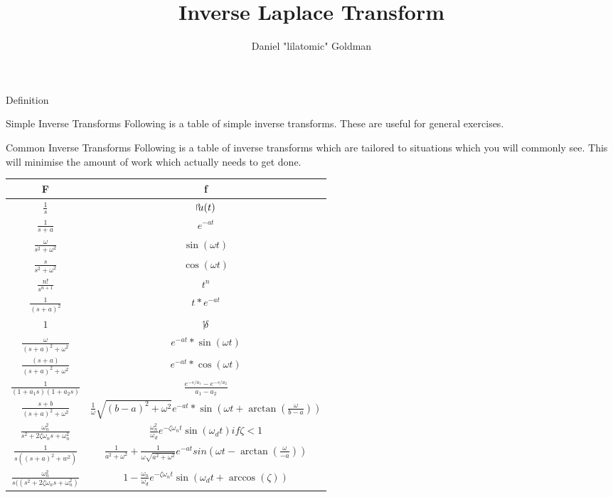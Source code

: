 \documentclass{../templates/mathtool}
\title{Inverse Laplace Transform}
\author{Daniel "lilatomic" Goldman}
\begin{document}
\maketitle

\begin{section}{Definition}
\end{section}

\begin{section}{Simple Inverse Transforms}
	Following is a table of simple inverse transforms. These are useful for general exercises.
\end{section}

\begin{section}{Common Inverse Transforms}
	Following is a table of inverse transforms which are tailored to situations which you will commonly see. This will minimise the amount of work which actually needs to get done.
	
\end{section}
	\begin{tabular}{|c|c|}
		\hline
		F & f \\
		\hline \hline
		$\frac{1}{s}$ & $\ustep(t)$ \\
			\hline
		$\frac{1}{s+a}$ & $e^{-at}$ \\
			\hline
		$\frac{\omega}{s^2+\omega^2}$ & $\sin{(\omega t)}$ \\
			\hline
		$\frac{s}{s^2+\omega^2}$ & $\cos{(\omega t)}$ \\
			\hline
		$\frac{n!}{s^{n+1}}$ & $t^n$ \\
			\hline
		$\frac{1}{(s+a)^2}$ & $t*e^{-at}$ \\
			\hline
		$1$ & $\impulse$ \\
			\hline
		$\frac{\omega}{(s+a)^2+\omega^2}$ & $e^{-at}*\sin{(\omega t)}$ \\
			\hline
		$\frac{(s+a)}{(s+a)^2+\omega^2}$ & $e^{-at}*\cos{(\omega t)}$ \\
			\hline
		$\frac{1}{(1+a_1s)(1+a_2s)}$ & $\frac{e^{-s/a_1}-e^{-s/a_2}}{a_1-a_2}$ \\
			\hline
		$\frac{s+b}{(s+a)^2+\omega^2}$ & $\frac{1}{\omega}\sqrt{(b-a)^2+\omega^2} e^{-at}*\sin{(\omega t+\arctan(\frac{\omega}{b-a}))}$ \\
			\hline
		$\frac{\omega_n^2}{s^2+2\zeta\omega_n s+\omega_n^2}$ & $\frac{\omega_n^2}{\omega_d}e^{-\zeta\omega_n t}\sin{(\omega_d t)} if \zeta < 1$ \\
			\hline
		$\frac{1}{s((s+a)^2+w^2)}$ & $\frac{1}{a^2+\omega^2}+\frac{1}{\omega\sqrt{a^2+\omega^2}}e^{-at}sin{(\omega t - \arctan{(\frac{\omega}{-a})})}$ \\
			\hline
		$\frac{\omega_n^2}{s((s^2 + 2\zeta\omega_n s + \omega_n^2)}$ & $1-\frac{\omega_n}{\omega_d}e^{-\zeta\omega_n t}\sin{(\omega_d t + \arccos{(\zeta)})}$ \\
		\hline
	\end{tabular}
	
\end{document}
